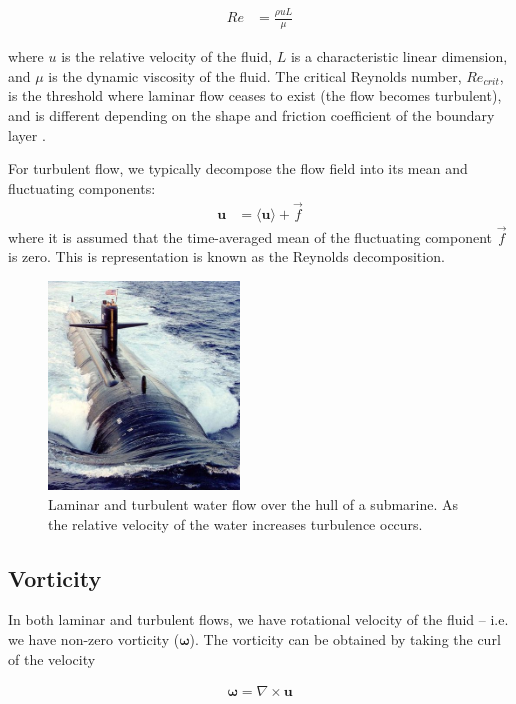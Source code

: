\documentclass[paper=a4, fontsize=11pt]{scrartcl} %
\numberwithin{equation}{section} %
\numberwithin{figure}{section} %
\numberwithin{table}{section} %
\begin{document}
\begin{align}
    Re &= \frac{\rho u L}{\mu}  
\end{align}

where $u$ is the relative velocity of the fluid, $L$ is a characteristic linear dimension, and $\mu$ is the dynamic viscosity of the fluid. The critical Reynolds number, $Re_{crit}$, is the threshold where laminar flow ceases to exist (the flow becomes turbulent), and is different depending on the shape and friction coefficient of the boundary layer 
\cite{reynoldshistory}.

For turbulent flow, we typically decompose the flow field into its mean and fluctuating components:
\begin{align} 
    \bm{u} &= \langle \bm{u} \rangle + \Vec{f}
\end{align}
where it is assumed that the time-averaged mean of the fluctuating component $\Vec{f}$ is zero. This is representation is known as the Reynolds decomposition.

\begin{figure}[!b]
    \centering
    \includegraphics[width=2in]{laminar_v_turbulent.jpg}
    \caption{Laminar and turbulent water flow over the hull of a submarine. As the relative velocity of the water increases turbulence occurs.}
    \label{fig:laminarvturbulent}
\end{figure}


\subsection{Vorticity}

In both laminar and turbulent flows, we have rotational velocity of the fluid -- i.e. we have 
non-zero vorticity ($\bm{\omega}$). The vorticity can be obtained by taking the curl of the velocity

\begin{align}
    \bm{\omega} = \nabla \times \bm{u}
\end{align}
\end{document}
